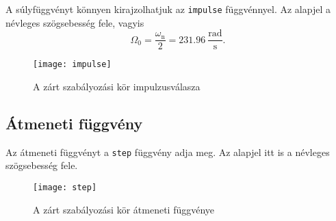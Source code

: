 A súlyfüggvényt könnyen kirajzolhatjuk az \verb|impulse| függvénnyel.
Az alapjel a névleges szögsebesség fele, vagyis
\begin{equation}
	\Omega_0 = \frac{\omega_\text{n}}{2} = 231.96~\frac{\text{rad}}{\text{s}}.
\end{equation}

\begin{figure}[H]
	\centering
	\texttt{[image: impulse]}
	\caption{A zárt szabályozási kör impulzusválasza}
	\label{fig:impulse}
\end{figure}


\subsection{Átmeneti függvény}

Az átmeneti függvényt a \verb|step| függvény adja meg.
Az alapjel itt is a névleges szögsebesség fele.

\begin{figure}[H]
	\centering
	\texttt{[image: step]}
	\caption{A zárt szabályozási kör átmeneti függvénye}
	\label{fig:step}
\end{figure}

